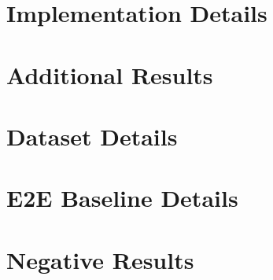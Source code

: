 \section{Implementation Details}
\label{app:implementation}


\section{Additional Results}
\label{app:additional_results}


\section{Dataset Details}
\label{app:datasets}


\section{E2E Baseline Details}
\label{app:e2e_details}


\section{Negative Results}
\label{app:negative_results}

